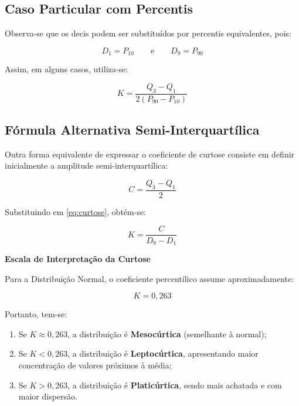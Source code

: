 \subsection{Caso Particular com Percentis}
Observa-se que os decis podem ser substituídos por percentis equivalentes,
pois:

\[
D_{1} = P_{10}
\qquad \text{e} \qquad
D_{9} = P_{90}
\]

Assim, em alguns casos, utiliza-se:

\[
K = \frac{Q_{3}-Q_{1}}{2(P_{90}-P_{10})}
\]

\subsection{Fórmula Alternativa Semi-Interquartílica}

Outra forma equivalente de expressar o coeficiente de curtose consiste em
definir inicialmente a amplitude semi-interquartílica:

\begin{equation}\label{eq:semiIQR}
C = \frac{Q_{3}-Q_{1}}{2}
\end{equation}

Substituindo em \eqref{eq:curtose}, obtém-se:

\begin{equation}\label{eq:curtose_alt}
K = \frac{C}{D_{9}-D_{1}}
\end{equation}



\textbf{Escala de Interpretação da Curtose}

Para a Distribuição Normal, o coeficiente percentílico assume aproximadamente:

\[
K = 0,263
\]

Portanto, tem-se:

\begin{enumerate}
    \item Se $K \approx 0,263$, a distribuição é \textbf{Mesocúrtica}
    (semelhante à normal);

    \item Se $K < 0,263$, a distribuição é \textbf{Leptocúrtica},
    apresentando maior concentração de valores próximos à média;

    \item Se $K > 0,263$, a distribuição é \textbf{Platicúrtica},
    sendo mais achatada e com maior dispersão.
\end{enumerate}

